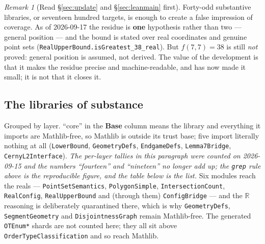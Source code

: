 \documentclass[11pt,a4paper]{article}
\theoremstyle{plain}
\theoremstyle{definition}
\theoremstyle{remark}
\newtheorem*{remark}{Remark}
\begin{document}
\begin{remark}[Read \S\ref{sec:update} and \S\ref{sec:leanmain} first]
Forty-odd substantive libraries, or seventeen hundred targets, is enough to
create a false impression of coverage. As of 2026-09-17 the residue is
\textbf{one} hypothesis rather than two --- general position --- and the bound
is stated over real coordinates and genuine point sets
(\texttt{RealUpperBound.isGreatest\_38\_real}). But $f(7,7)=38$ is still
\emph{not} proved: general position is assumed, not derived. The value of the
development is that it makes the residue precise and machine-readable, and has
now made it small; it is not that it closes it.
\end{remark}

\subsection*{The libraries of substance}

Grouped by layer. ``core'' in the \textbf{Base} column means the library and
everything it imports are Mathlib-free, so Mathlib is outside its trust base;
five import literally nothing at all
(\texttt{LowerBound}, \texttt{GeometryDefs}, \texttt{EndgameDefs},
\texttt{Lemma7Bridge}, \texttt{CernyL2Interface}). \emph{The per-layer tallies
in this paragraph were counted on 2026-09-15 and the numbers ``fourteen'' and
``nineteen'' no longer add up; the \texttt{grep} rule above is the reproducible
figure, and the table below is the list.} Six modules reach the reals ---
\texttt{PointSetSemantics}, \texttt{PolygonSimple}, \texttt{IntersectionCount},
\texttt{RealConfig}, \texttt{RealUpperBound} and (through them)
\texttt{ConfigBridge} --- and the $\mathbb{R}$ reasoning is deliberately
quarantined there, which is why \texttt{GeometryDefs},
\texttt{SegmentGeometry} and \texttt{DisjointnessGraph} remain Mathlib-free.
The generated
\texttt{OTEnum*} shards are not counted here; they all sit above
\texttt{OrderTypeClassification} and so reach Mathlib.
\end{document}
